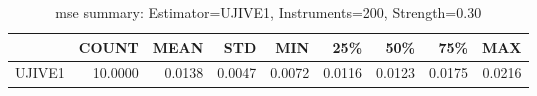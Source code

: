 \begin{table}[ht]
\centering
\caption{mse summary: Estimator=UJIVE1, Instruments=200, Strength=0.30}
\begin{tabular}{lrrrrrrrr}
\toprule
 & COUNT & MEAN & STD & MIN & 25\% & 50\% & 75\% & MAX \\
\midrule
UJIVE1 & 10.0000 & 0.0138 & 0.0047 & 0.0072 & 0.0116 & 0.0123 & 0.0175 & 0.0216 \\
\bottomrule
\end{tabular}
\end{table}
